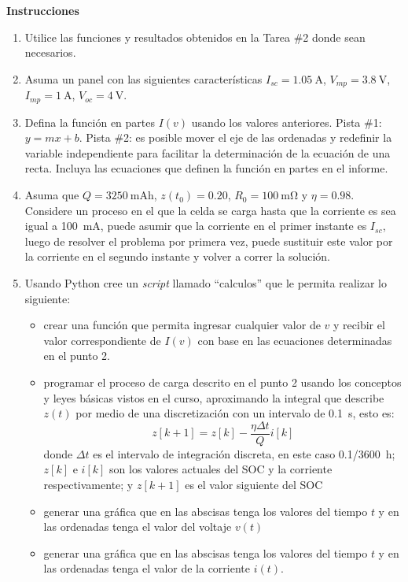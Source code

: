 \documentclass[12pt]{article}
\begin{document}
\textbf{Instrucciones}
\begin{enumerate}
    \item Utilice las funciones y resultados obtenidos en la Tarea \#2 donde sean necesarios. 
    \item Asuma un panel con las siguientes características $I_{sc} = \SI{1.05}{\ampere}$, $V_{mp}=\SI{3.8}{\volt}$, $I_{mp}=\SI{1}{\ampere}$,  $V_{oc}= \SI{4}{\volt}$. 
    \item Defina la función en partes $I(v)$ usando los valores anteriores. Pista \#1: $y=mx+b$. Pista \#2: es posible mover el eje de las ordenadas y redefinir la variable independiente para facilitar la determinación de la ecuación de una recta. Incluya las ecuaciones que definen la función en partes en el informe. 
    \item Asuma que $Q = \SI{3250}{\milli\ampere\hour}$, $z(t_0) = 0.20$, $R_0 = \SI{100}{\milli\ohm}$ y $\eta = 0.98$. Considere un proceso en el que la celda se carga hasta que la corriente es sea igual a \SI{100}{\milli\ampere}, puede asumir que la corriente en el primer instante es $I_{sc}$, luego de resolver el problema por primera vez, puede sustituir este valor por la corriente en el segundo instante y volver a correr la solución.
    \item Usando Python cree un \emph{script} llamado ``calculos'' que le permita realizar lo siguiente:
    \begin{itemize}
        \item crear una función que permita ingresar cualquier valor de $v$ y recibir el valor correspondiente de $I(v)$ con base en las ecuaciones determinadas en el punto 2.
        \item programar el proceso de carga descrito en el punto 2 usando los conceptos y leyes básicas vistos en el curso, aproximando la integral que describe $z(t)$ por medio de una discretización con un intervalo de \SI{0.1}{\second}, esto es: 
        \begin{equation*}
            z[k+1] = z[k] - \dfrac{\eta \Delta t}{Q}i[k]
        \end{equation*}
        donde $\Delta t$ es el intervalo de integración discreta, en este caso \SI{0.1/3600}{\hour}; $z[k]$ e $i[k]$ son los valores actuales del SOC y la corriente respectivamente; y $z[k+1]$ es el valor siguiente del SOC
        \item generar una gráfica que en las abscisas tenga los valores del tiempo $t$ y en las ordenadas tenga el valor del voltaje $v(t)$
        \item generar una gráfica que en las abscisas tenga los valores del tiempo $t$ y en las ordenadas tenga el valor de la corriente $i(t)$. 

\end{itemize}
\end{enumerate}
\end{document}
